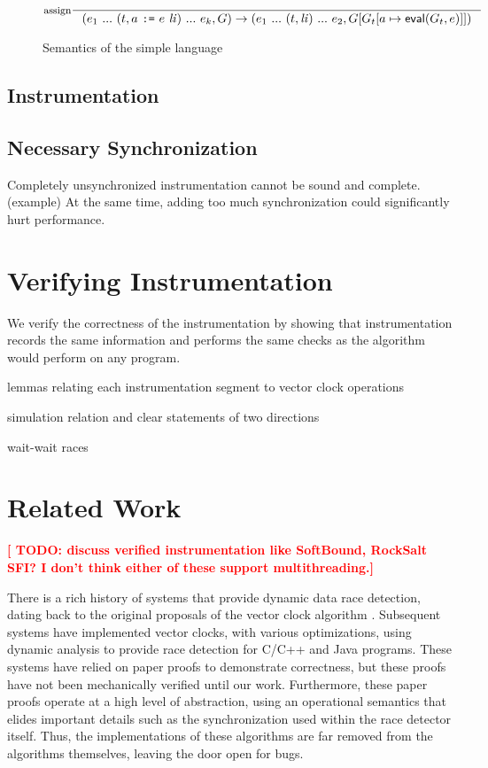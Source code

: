 \documentclass[preprint, 10pt]{sigplanconf}
\newcommand{\TODO}[1]{\textbf{\textcolor{red}{[ TODO: #1]}}}
\newcommand{\assign}[2]{#1\ \texttt{:=}\ #2}
\begin{document}
\begin{figure}[htb]
$$\inference[assign]{}{(e_1\ ...\ (t, \assign{a}{e}\ \mathit{li})\ ...\ e_k, G) \rightarrow (e_1\ ...\ (t, \mathit{li})\ ...\ e_2, G[G_t[a \mapsto \mathsf{eval}(G_t, e)]])}$$

\caption{Semantics of the simple language}
\label{semantics}
\end{figure}


\subsection{Instrumentation}

\subsection{Necessary Synchronization}
Completely unsynchronized instrumentation cannot be sound and complete. (example) At the same time, adding too much synchronization could significantly hurt performance.

\section{Verifying Instrumentation}
We verify the correctness of the instrumentation by showing that instrumentation records the same information and performs the same checks as the algorithm would perform on any program.

lemmas relating each instrumentation segment to vector clock operations

simulation relation and clear statements of two directions

wait-wait races

\section{Related Work}

\TODO{discuss verified instrumentation like SoftBound, RockSalt SFI? I don't think either of these support multithreading.}

There is a rich history of systems that provide dynamic data race detection, dating back to the original proposals of the vector clock algorithm \cite{friedmann,mattern,lamportvc}. Subsequent systems have implemented vector clocks, with various optimizations, using dynamic analysis to provide race detection for C/C++ \cite{pozniansky_efficient_2003,serebryany_threadsanitizer:_2009} and Java \cite{christiaens_trade:_2001,elmas_goldilocks:_2007,flanagan_fasttrack:_2009,flanagan_fasttrack:_2010,slimstate} programs. These systems have relied on paper proofs to demonstrate correctness, but these proofs have not been mechanically verified until our work. Furthermore, these paper proofs operate at a high level of abstraction, using an operational semantics that elides important details such as the synchronization used within the race detector itself. Thus, the implementations of these algorithms are far removed from the algorithms themselves, leaving the door open for bugs.
\end{document}
